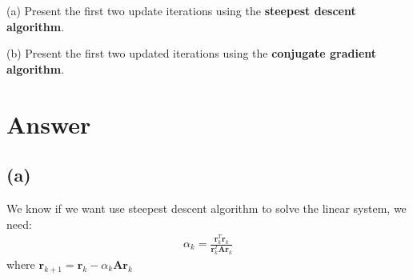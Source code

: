 \documentclass{article}
\begin{document}
(a) Present the first two update iterations using the \textbf{steepest descent algorithm}. 

(b) Present the first two updated iterations using the \textbf{conjugate gradient algorithm}.


\section*{Answer}
\subsection*{(a)}
We know if we want use steepest descent algorithm to solve the linear system, we need:
\begin{align*}
    \alpha_k = \frac{\bm{r}_k^T\bm{r}_k}{\bm{r}_k^T\bm{A}\bm{r}_k}
\end{align*}
where \(\bm{r}_{k+1} = \bm{r}_k - \alpha_k \bm{A} \bm{r}_k\)
\end{document}
